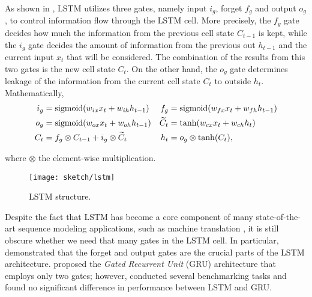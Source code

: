 As shown in \addfigure{\ref{fig:lstm_structure}}, LSTM utilizes three gates, namely input $i_g$, forget $f_g$ and output $o_g$, to control  information flow through the LSTM cell. More precisely, the $f_g$ gate decides how much the information from the previous cell state $C_{t-1}$ is kept, while the $i_g$ gate decides the amount of information from the previous out $h_{t-1}$ and the current input $x_t$ that will be considered.  The combination of the results from this two gates is the new cell state $C_{t}$. On the other hand, the $o_g$ gate determines leakage of the information from the current cell state $C_t$ to outside $h_t$. Mathematically, 
\begin{align*}
	i_g &= \text{sigmoid}( w_{ix} x_t + w_{ih} h_{t-1} )  &  	f_g &= \text{sigmoid}( w_{fx} x_t + w_{fh} h_{t-1} )\\
	o_g &= \text{sigmoid}( w_{ox} x_t + w_{oh} h_{t-1} ) & \widetilde{C}_t &= \tanh(w_{cx} x_t + w_{ch} h_t) \\
	C_t &= f_g \otimes C_{t-1} + i_g  \otimes  \widetilde{C}_t & h_{t} &= o_g \otimes \tanh(C_t),
\end{align*}

where $\otimes$ the element-wise multiplication.


\begin{figure}
\centering
\texttt{[image: sketch/lstm]}
\caption{LSTM structure.} 

\label{fig:lstm_structure} 
\end{figure}

Despite the fact that  LSTM has become a core component of many state-of-the-art sequence modeling applications, such as machine translation \citep{MelisStateArtEvaluation2018}, it is still obscure whether we need that many gates in the LSTM cell. In particular, \citet{GreffLSTMsearchspace2017} demonstrated that the forget and output gates are the crucial parts of the LSTM architecture.  \citet{ChoLearningPhraseRepresentations2014a} proposed the \textit{Gated Recurrent Unit} (GRU) architecture that employs only two	 gates; however, \citet{JozefowiczEmpiricalExplorationRecurrent2015} conducted several benchmarking tasks and found no significant difference in performance between LSTM and GRU. 

